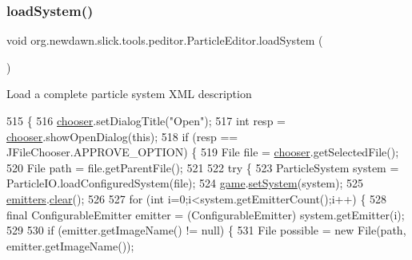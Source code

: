 \subsubsection{\texorpdfstring{load\+System()}{loadSystem()}}
{\footnotesize\ttfamily void org.\+newdawn.\+slick.\+tools.\+peditor.\+Particle\+Editor.\+load\+System (\begin{DoxyParamCaption}{ }\end{DoxyParamCaption})\hspace{0.3cm}{\ttfamily [inline]}}

Load a complete particle system X\+ML description 
\begin{DoxyCode}
515                              \{
516         \mbox{\hyperlink{classorg_1_1newdawn_1_1slick_1_1tools_1_1peditor_1_1_particle_editor_a7a921beab5e50d8482810cf42136ee17}{chooser}}.setDialogTitle(\textcolor{stringliteral}{"Open"});
517         \textcolor{keywordtype}{int} resp = \mbox{\hyperlink{classorg_1_1newdawn_1_1slick_1_1tools_1_1peditor_1_1_particle_editor_a7a921beab5e50d8482810cf42136ee17}{chooser}}.showOpenDialog(\textcolor{keyword}{this});
518         \textcolor{keywordflow}{if} (resp == JFileChooser.APPROVE\_OPTION) \{
519             File file = \mbox{\hyperlink{classorg_1_1newdawn_1_1slick_1_1tools_1_1peditor_1_1_particle_editor_a7a921beab5e50d8482810cf42136ee17}{chooser}}.getSelectedFile();
520             File path = file.getParentFile();
521             
522             \textcolor{keywordflow}{try} \{
523                 ParticleSystem system = ParticleIO.loadConfiguredSystem(file);
524                 \mbox{\hyperlink{classorg_1_1newdawn_1_1slick_1_1tools_1_1peditor_1_1_particle_editor_a30ffb1c9b34c421c0ef6a28efbaaa450}{game}}.\mbox{\hyperlink{classorg_1_1newdawn_1_1slick_1_1tools_1_1peditor_1_1_particle_game_af5abd2643e2206a84401965789da9ca2}{setSystem}}(system);
525                 \mbox{\hyperlink{classorg_1_1newdawn_1_1slick_1_1tools_1_1peditor_1_1_particle_editor_adf3a8d24a0adf9e68e06a87f37ff378a}{emitters}}.\mbox{\hyperlink{classorg_1_1newdawn_1_1slick_1_1tools_1_1peditor_1_1_emitter_list_ae05eade7e60681dcd66ec02b53c1b813}{clear}}();
526                 
527                 \textcolor{keywordflow}{for} (\textcolor{keywordtype}{int} i=0;i<system.getEmitterCount();i++) \{
528                     \textcolor{keyword}{final} ConfigurableEmitter emitter = (ConfigurableEmitter) system.getEmitter(i);
529                     
530                     \textcolor{keywordflow}{if} (emitter.getImageName() != null) \{
531                         File possible = \textcolor{keyword}{new} File(path, emitter.getImageName());

\end{DoxyCode}
